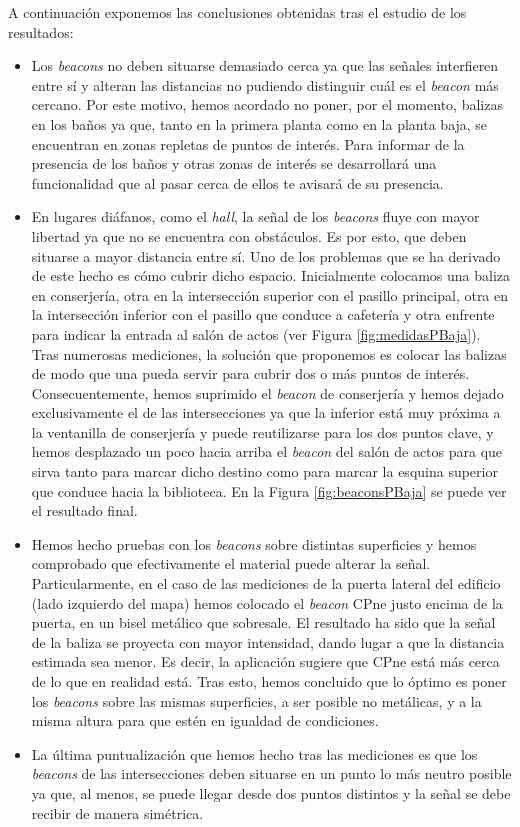 A continuación exponemos las conclusiones obtenidas tras el estudio de los resultados:
\begin{itemize}
	\item Los \textit{beacons} no deben situarse demasiado cerca ya que las señales interfieren entre sí y alteran las distancias no pudiendo distinguir cuál es el \textit{beacon} más cercano. Por este motivo, hemos acordado no poner, por el momento, balizas en los baños ya que, tanto en la primera planta como en la planta baja, se encuentran en zonas repletas de puntos de interés. Para informar de la presencia de los baños y otras zonas de interés se desarrollará una funcionalidad que al pasar cerca de ellos te avisará de su presencia.
	
	\item En lugares diáfanos, como el \textit{hall}, la señal de los \textit{beacons} fluye con mayor libertad ya que no se encuentra con obstáculos. Es por esto, que deben situarse a mayor distancia entre sí. Uno de los problemas que se ha derivado de este hecho es cómo cubrir dicho espacio. Inicialmente colocamos una baliza en conserjería, otra en la intersección superior con el pasillo principal, otra en la intersección inferior con el pasillo que conduce a cafetería y otra enfrente para indicar la entrada al salón de actos (ver Figura \ref{fig:medidasPBaja}). Tras numerosas mediciones, la solución que proponemos es colocar las balizas de modo que una pueda servir para cubrir dos o más puntos de interés. Consecuentemente, hemos suprimido el \textit{beacon} de conserjería y hemos dejado exclusivamente el de las intersecciones ya que la inferior está muy próxima a la ventanilla de conserjería y puede reutilizarse para los dos puntos clave, y hemos desplazado un poco hacia arriba el \textit{beacon} del salón de actos para que sirva tanto para marcar dicho destino como para marcar la esquina superior que conduce hacia la biblioteca. En la Figura \ref{fig:beaconsPBaja} se puede ver el resultado final.
	
	\item Hemos hecho pruebas con los \textit{beacons} sobre distintas superficies y hemos comprobado que efectivamente el material puede alterar la señal. Particularmente, en el caso de las mediciones de la puerta lateral del edificio (lado izquierdo del mapa) hemos colocado el \textit{beacon} CPne justo encima de la puerta, en un bisel metálico que sobresale. El resultado ha sido que la señal de la baliza se proyecta con mayor intensidad, dando lugar a que la distancia estimada sea menor. Es decir, la aplicación sugiere que CPne está más cerca de lo que en realidad está. Tras esto, hemos concluido que lo óptimo es poner los \textit{beacons} sobre las mismas superficies, a ser posible no metálicas, y a la misma altura para que estén en igualdad de condiciones. 
	
	\item La última puntualización que hemos hecho tras las mediciones es que los \textit{beacons} de las intersecciones deben situarse en un punto lo más neutro posible ya que, al menos, se puede llegar desde dos puntos distintos y la señal se debe recibir de manera simétrica. 
\end{itemize}




